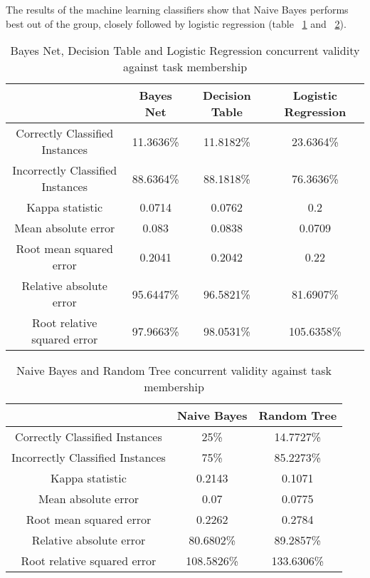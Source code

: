 The results of the machine learning classifiers show that Naive Bayes performs best out of the group, closely followed by logistic regression (table ~\ref{tab:ml1currenttask} and ~\ref{tab:ml2currenttask}). 

\begin{table}[!h]
\centering
\begin{tabular}{|c|c|c|c|}
                                 & Bayes Net  & Decision Table  & Logistic Regression \\ \hline
Correctly Classified Instances   & 11.3636\%      & 11.8182\%  & 23.6364\%  \\
Incorrectly Classified Instances & 88.6364\%      & 88.1818\% & 76.3636\%   \\
Kappa statistic                  & 0.0714         & 0.0762    & 0.2         \\
Mean absolute error              & 0.083          & 0.0838    & 0.0709      \\
Root mean squared error          & 0.2041         & 0.2042    & 0.22        \\
Relative absolute error          & 95.6447\%      & 96.5821\% & 81.6907\%   \\
Root relative squared error      & 97.9663\%      & 98.0531\% & 105.6358\%  \\
\end{tabular}
\caption{Bayes Net, Decision Table and Logistic Regression concurrent validity against task membership}
\label{tab:ml1currenttask}
\end{table}


\begin{table}[!h]
\centering
\begin{tabular}{|c|c|c|}
                                 & Naive Bayes & Random Tree\\ \hline
Correctly Classified Instances   & 25\%      &  14.7727\%\\
Incorrectly Classified Instances & 75\%      &  85.2273\%\\
Kappa statistic                  & 0.2143    & 0.1071\\
Mean absolute error              & 0.07      & 0.0775\\
Root mean squared error          & 0.2262    & 0.2784\\
Relative absolute error          & 80.6802\% & 89.2857\%\\
Root relative squared error      & 108.5826\% & 133.6306\%\\
\end{tabular}
\caption{Naive Bayes and Random Tree concurrent validity against task membership}
\label{tab:ml2currenttask}
\end{table}

